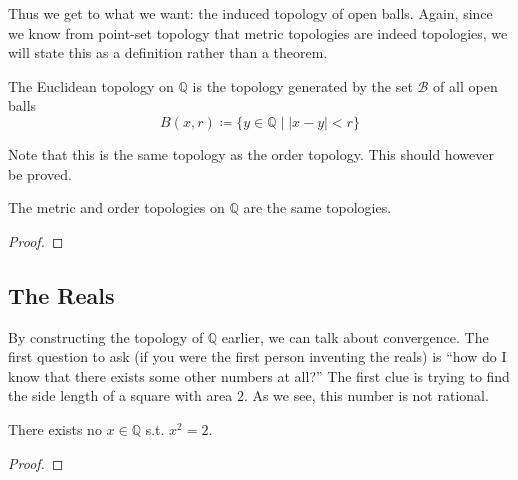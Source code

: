 \documentclass{article}
\begin{document}
      Thus we get to what we want: the induced topology of open balls. 
      Again, since we know from point-set topology that metric topologies are indeed topologies, we will state this as a definition rather than a theorem.  

      \begin{definition}
        The Euclidean topology on $\mathbb{Q}$ is the topology generated by the set $\mathscr{B}$ of all open balls
        \begin{equation}
          B(x, r) \coloneqq \{ y \in \mathbb{Q} \mid |x - y| < r \}
        \end{equation} 
      \end{definition}

      Note that this is the same topology as the order topology. This should however be proved. 

      \begin{theorem}
        The metric and order topologies on $\mathbb{Q}$ are the same topologies. 
      \end{theorem}
      \begin{proof}
        
      \end{proof}

  \subsection{The Reals}

      By constructing the topology of $\mathbb{Q}$ earlier, we can talk about convergence. The first question to ask (if you were the first person inventing the reals) is ``how do I know that there exists some other numbers at all?'' The first clue is trying to find the side length of a square with area $2$. As we see, this number is not rational. 

      \begin{theorem}
        There exists no $x \in \mathbb{Q}$ s.t. $x^2 = 2$. 
      \end{theorem}
      \begin{proof}
        
      \end{proof} 
\end{document}
